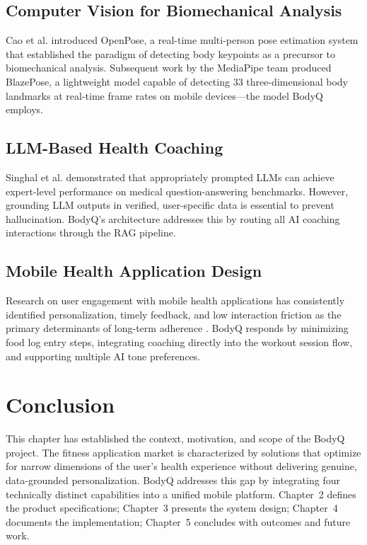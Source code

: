 \subsection{Computer Vision for Biomechanical Analysis}

Cao et al. \cite{cao2017realtime} introduced OpenPose, a real-time
multi-person pose estimation system that established the paradigm of
detecting body keypoints as a precursor to biomechanical analysis.
Subsequent work by the MediaPipe team \cite{bazarevsky2020blazepose}
produced BlazePose, a lightweight model capable of detecting 33
three-dimensional body landmarks at real-time frame rates on mobile
devices---the model BodyQ employs.

\subsection{LLM-Based Health Coaching}

Singhal et al. \cite{pal2023medpalm} demonstrated that appropriately
prompted LLMs can achieve expert-level performance on medical
question-answering benchmarks. However, grounding LLM outputs in
verified, user-specific data is essential to prevent hallucination.
BodyQ's architecture addresses this by routing all AI coaching
interactions through the RAG pipeline.

\subsection{Mobile Health Application Design}

Research on user engagement with mobile health applications has
consistently identified personalization, timely feedback, and low
interaction friction as the primary determinants of long-term adherence
\cite{linardon2020engagement}. BodyQ responds by minimizing food log
entry steps, integrating coaching directly into the workout session flow,
and supporting multiple AI tone preferences.

\section{Conclusion}

This chapter has established the context, motivation, and scope of the
BodyQ project. The fitness application market is characterized by
solutions that optimize for narrow dimensions of the user's health
experience without delivering genuine, data-grounded personalization.
BodyQ addresses this gap by integrating four technically distinct
capabilities into a unified mobile platform. Chapter~2 defines the
product specifications; Chapter~3 presents the system design; Chapter~4
documents the implementation; Chapter~5 concludes with outcomes and
future work.
